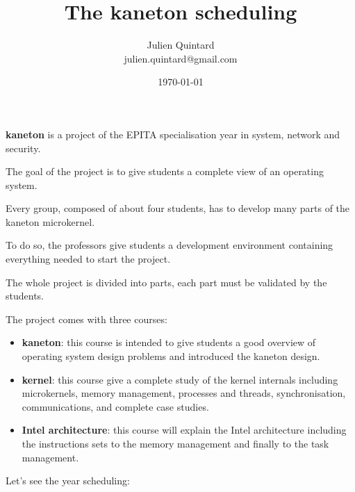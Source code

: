 \documentclass[10pt,a4wide]{article}
\title{The kaneton scheduling}
\author{\small{Julien Quintard} \\
        \scriptsize{julien.quintard@gmail.com}}
\date{\scriptsize{\today}}
\begin{document}
\maketitle

%
%

\begin{multicols}{2}



\textbf{kaneton} is a project of the EPITA specialisation year in system,
network and security.

The goal of the project is to give students a complete view of an operating
system.

Every group, composed of about four students, has to develop many parts
of the kaneton microkernel.

To do so, the professors give students a development environment containing
everything needed to start the project.

The whole project is divided into parts, each part must be validated by
the students.

The project comes with three courses:

\begin{itemize}
  \item
    \textbf{kaneton}: this course is intended to give students a good overview
    of operating system design problems and introduced the kaneton design.
  \item
    \textbf{kernel}: this course give a complete study of the kernel
    internals including microkernels, memory management, processes and threads,
    synchronisation, communications, and complete case studies.
  \item
    \textbf{Intel architecture}: this course will explain the Intel
    architecture including the instructions sets to the memory management
    and finally to the task management.
\end{itemize}

Let's see the year scheduling:


\end{multicols}
\end{document}
